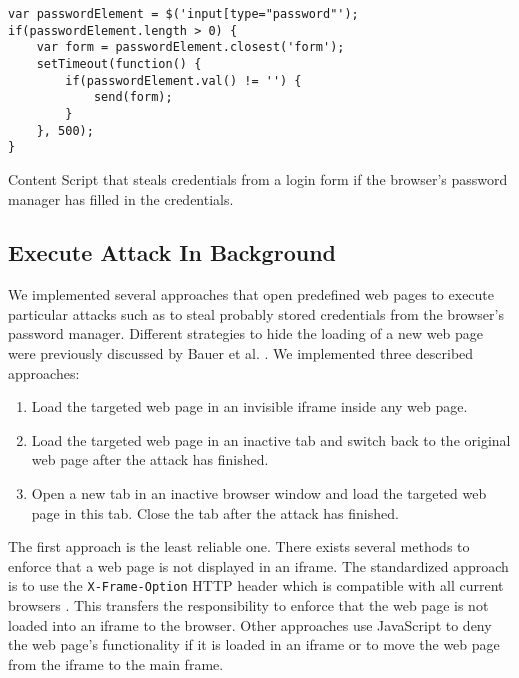 	\begin{code}
		\begin{lstlisting}
var passwordElement = $('input[type="password"');
if(passwordElement.length > 0) {
	var form = passwordElement.closest('form');
	setTimeout(function() {
		if(passwordElement.val() != '') {
			send(form);
		}
	}, 500);
}
\end{lstlisting}
		\caption{Content Script that steals credentials from a login form if the browser's password manager has filled in the credentials.}
		\label{code:stealCredentialsFromPasswordManager}
	\end{code}
	
	
	
\subsection{Execute Attack In Background}

	We implemented several approaches that open predefined web pages to execute particular attacks such as to steal probably stored credentials from the browser's password manager. Different strategies to hide the loading of a new web page were previously discussed by Bauer et al. \cite{extensions:cns14}. We implemented three described approaches:
	
	\begin{enumerate}
		\item Load the targeted web page in an invisible iframe inside any web page.
		\item Load the targeted web page in an inactive tab and switch back to the original web page after the attack has finished.
		\item Open a new tab in an inactive browser window and load the targeted web page in this tab. Close the tab after the attack has finished.
	\end{enumerate} 
	
	The first approach is the least reliable one. There exists several methods to enforce that a web page is not displayed in an iframe. The standardized approach is to use the \texttt{X-Frame-Option} HTTP header which is compatible with all current browsers \cite{xFrameOptionsSpezification, xFrameOptionsCompability}. This transfers the responsibility to enforce that the web page is not loaded into an iframe to the browser. Other approaches use JavaScript to deny the web page's functionality if it is loaded in an iframe or to move the web page from the iframe to the main frame.
		
